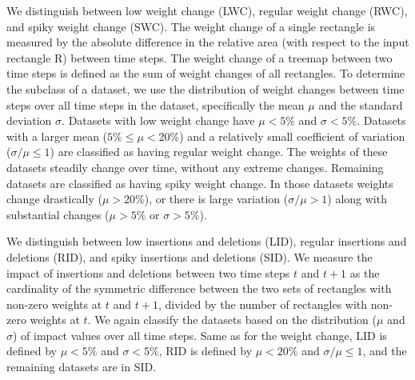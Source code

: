  We distinguish between low weight change (LWC), regular weight change (RWC), and spiky weight change (SWC). The weight change of a single rectangle is measured by the absolute difference in the relative area (with respect to the input rectangle R) between time steps. The weight change of a treemap between two time steps is defined as the sum of weight changes of all rectangles. To determine the subclass of a dataset, we use the distribution of weight changes between time steps over all time steps in the dataset, specifically the mean $\mu$ and the standard deviation $\sigma$. Datasets with low weight change have $\mu < 5\%$ and $\sigma < 5\%$. Datasets with a larger mean ($5\% \leq \mu < 20\%$) and a relatively small coefficient of variation ($\sigma/\mu \leq 1$) are classified as having regular weight change. The weights of these datasets steadily change over time, without any extreme changes. Remaining datasets are classified as having spiky weight change. In those datasets weights change drastically ($\mu > 20\%$), or there is large variation ($\sigma/\mu > 1$) along with substantial changes ($\mu > 5\%$ or $\sigma > 5\%$). 


 We distinguish between low insertions and deletions (LID), regular insertions and deletions (RID), and spiky insertions and deletions (SID). We measure the impact of insertions and deletions between two time steps $t$ and $t+1$ as the cardinality of the symmetric difference between the two sets of rectangles with non-zero weights at $t$ and $t+1$, divided by the number of rectangles with non-zero weights at $t$. We again classify the datasets based on the distribution ($\mu$ and $\sigma$) of impact values over all time steps. Same as for the weight change, LID is defined by $\mu < 5\%$ and $\sigma < 5\%$, RID is defined by $\mu < 20\%$ and $\sigma/\mu \leq 1$, and the remaining datasets are in SID. 


